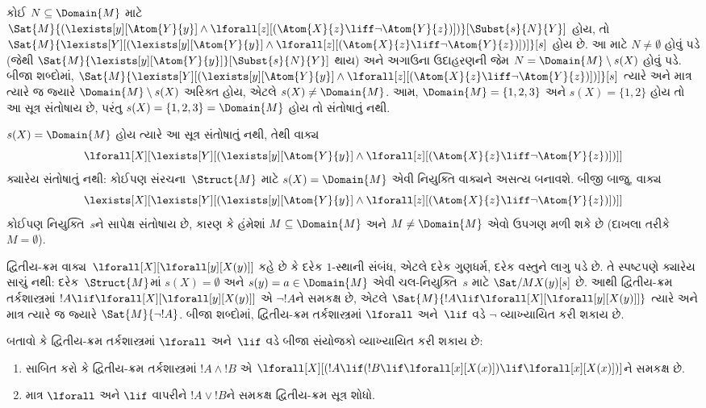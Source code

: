 \begin{ex}
  કોઈ $N \subseteq \Domain{M}$ માટે
  $\Sat{M}{(\lexists[y][\Atom{Y}{y}] \land \lforall[z][(\Atom{X}{z}
  \liff \lnot \Atom{Y}{z})])}[\Subst{s}{N}{Y}]$ હોય, તો
  $\Sat{M}{\lexists[Y][(\lexists[y][\Atom{Y}{y}] \land
  \lforall[z][(\Atom{X}{z} \liff \lnot \Atom{Y}{z})])]}[s]$ હોય છે.
  આ માટે $N \neq \emptyset$ હોવું પડે (જેથી
  $\Sat{M}{\lexists[y][\Atom{Y}{y}]}[\Subst{s}{N}{Y}]$ થાય) અને
  અગાઉના ઉદાહરણની જેમ $N = \Domain{M} \setminus s(X)$ હોવું પડે.
  બીજા શબ્દોમાં,
  $\Sat{M}{\lexists[Y][(\lexists[y][\Atom{Y}{y}] \land
  \lforall[z][(\Atom{X}{z} \liff \lnot \Atom{Y}{z})])]}[s]$
  ત્યારે અને માત્ર ત્યારે જ જ્યારે $\Domain{M} \setminus s(X)$
  અરિક્ત હોય, એટલે $s(X) \neq \Domain{M}$. આમ,
  $\Domain{M} = \{1, 2, 3\}$ અને $s(X) = \{1, 2\}$ હોય તો આ
  સૂત્ર સંતોષાય છે, પરંતુ $s(X) = \{1, 2, 3\} = \Domain{M}$
  હોય તો સંતોષાતું નથી.

  $s(X) = \Domain{M}$ હોય ત્યારે આ સૂત્ર સંતોષાતું નથી, તેથી
  વાક્ય
  \[
  \lforall[X][\lexists[Y][(\lexists[y][\Atom{Y}{y}] \land
      \lforall[z][(\Atom{X}{z} \liff \lnot \Atom{Y}{z})])]]
  \]
  ક્યારેય સંતોષાતું નથી: કોઈપણ સંરચના~$\Struct{M}$ માટે
  $s(X) = \Domain{M}$ એવી નિયુક્તિ વાક્યને અસત્ય બનાવશે.
  બીજી બાજુ, વાક્ય
  \[
  \lexists[X][\lexists[Y][(\lexists[y][\Atom{Y}{y}] \land
      \lforall[z][(\Atom{X}{z} \liff \lnot \Atom{Y}{z})])]]
  \]
  કોઈપણ નિયુક્તિ~$s$ને સાપેક્ષ સંતોષાય છે, કારણ કે હંમેશાં
  $M \subseteq \Domain{M}$ અને $M \neq \Domain{M}$ એવો ઉપગણ મળી
  શકે છે (દાખલા તરીકે $M = \emptyset$).
\end{ex}

\begin{ex}
  દ્વિતીય-ક્રમ વાક્ય~$\lforall[X][\lforall[y][X(y)]]$ કહે છે
  કે દરેક $1$-સ્થાની સંબંધ, એટલે દરેક ગુણધર્મ, દરેક વસ્તુને લાગુ પડે
  છે. તે સ્પષ્ટપણે ક્યારેય સાચું નથી: દરેક~$\Struct{M}$માં
  $s(X) = \emptyset$ અને $s(y) = a \in \Domain{M}$ એવી
  ચલ-નિયુક્તિ~$s$ માટે $\Sat/{M}{X(y)}[s]$ છે. આથી દ્વિતીય-ક્રમ
  તર્કશાસ્ત્રમાં $!A \lif \lforall[X][\lforall[y][X(y)]]$ એ
  $\lnot !A$ને સમકક્ષ છે, એટલે
  $\Sat{M}{!A \lif
  \lforall[X][\lforall[y][X(y)]]}$ ત્યારે અને માત્ર ત્યારે જ
  જ્યારે $\Sat{M}{\lnot !A}$. બીજા શબ્દોમાં, દ્વિતીય-ક્રમ
  તર્કશાસ્ત્રમાં $\lforall$ અને~$\lif$ વડે $\lnot$ વ્યાખ્યાયિત
  કરી શકાય છે.
\end{ex}

\begin{prob}
  બતાવો કે દ્વિતીય-ક્રમ તર્કશાસ્ત્રમાં $\lforall$ અને~$\lif$ વડે
  બીજા સંયોજકો વ્યાખ્યાયિત કરી શકાય છે:
  \begin{enumerate}
    \item સાબિત કરો કે દ્વિતીય-ક્રમ તર્કશાસ્ત્રમાં $!A \land !B$ એ
    $\lforall[X][(!A \lif (!B \lif \lforall[x][X(x)])\lif
    \lforall[x][X(x)])]$ને સમકક્ષ છે.
    \item માત્ર $\lforall$ અને $\lif$ વાપરીને $!A \lor !B$ને
    સમકક્ષ દ્વિતીય-ક્રમ સૂત્ર શોધો.
  \end{enumerate}
\end{prob}
\endgroup


